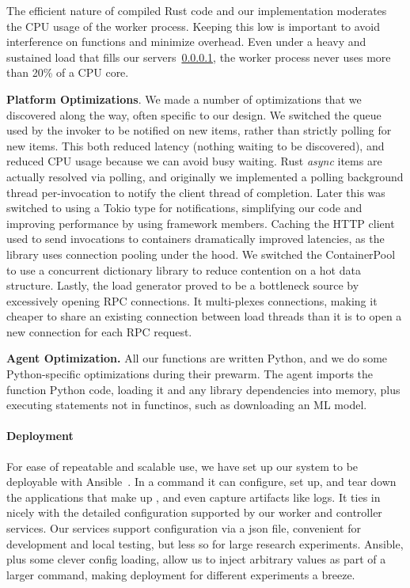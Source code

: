 The efficient nature of compiled Rust code and our implementation moderates the CPU usage of the worker process.
Keeping this low is important to avoid interference on functions and minimize overhead.
Even under a heavy and sustained load that fills our servers~\ref{}, the \sysname{} worker process never uses more than 20\% of a CPU core.

\textbf{Platform Optimizations}.
We made a number of optimizations that we discovered along the way, often specific to our design.
We switched the queue used by the invoker to be notified on new items, rather than strictly polling for new items.
This both reduced latency (nothing waiting to be discovered), and reduced CPU usage because we can avoid busy waiting.
Rust \emph{async} items are actually resolved via polling, and originally we implemented a polling background thread per-invocation to notify the client thread of completion.
Later this was switched to using a Tokio type for notifications, simplifying our code and improving performance by using framework members.
Caching the HTTP client used to send invocations to containers dramatically improved latencies, as the library uses connection pooling under the hood.
We switched the ContainerPool to use a concurrent dictionary library to reduce contention on a hot data structure.
Lastly, the load generator proved to be a bottleneck source by excessively opening RPC connections.
It multi-plexes connections, making it cheaper to share an existing connection between load threads than it is to open a new connection for each RPC request.

\noindent \textbf{Agent Optimization.}
All our functions are written Python, and we do some Python-specific optimizations during their prewarm.
The agent imports the function Python code, loading it and any library dependencies into memory, plus executing statements not in functinos, such as downloading an ML model.



\paragraph{Deployment}
For ease of repeatable and scalable use, we have set up our system to be deployable with Ansible~\cite{}.
In a command it can configure, set up, and tear down the applications that make up \sysname{}, and even capture artifacts like logs.
It ties in nicely with the detailed configuration supported by our worker and controller services.
Our services support configuration via a json file, convenient for development and local testing, but less so for large research experiments.
Ansible, plus some clever config loading, allow us to inject arbitrary values as part of a larger command, making deployment for different experiments a breeze.

